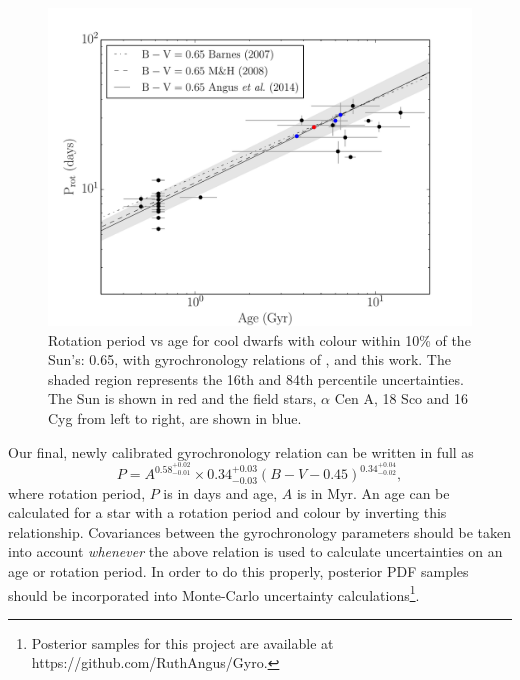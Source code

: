 \documentclass[useAMS, usenatbib]{mn2e}
\newcommand{\gyroa}{0.34}
\newcommand{\aerrp}{0.03}
\newcommand{\aerrm}{0.03}
\newcommand{\gyron}{0.58}
\newcommand{\nerrp}{0.02}
\newcommand{\nerrm}{0.01}
\newcommand{\gyrob}{0.34}
\newcommand{\berrp}{0.04}
\newcommand{\berrm}{0.02}
\begin{document}
\begin{figure}
\begin{center}
\includegraphics[width=6in, clip=true, trim=0 0 0.5in 0]{p_vs_a_solar.pdf}
\caption{Rotation period vs age for cool dwarfs with colour within 10\% of the
	Sun's: 0.65, with gyrochronology relations of \citet{Barnes2007},
	\citet{Mamajek2008} and this work. The shaded region represents the
	16th and 84th percentile uncertainties. The Sun is shown in red and the
	field stars, $\alpha$ Cen A, 18 Sco and 16 Cyg from left to right, are
	shown in blue.
\label{fig:p_vs_a_solar}}
\end{center}
\end{figure}

Our final, newly calibrated gyrochronology relation can be written in full as
\begin{equation}
	P = A^{\gyron^{+\nerrp}_{-\nerrm}} \times \gyroa^{+\aerrp}_{-\aerrm}
	(B-V-0.45)^{\gyrob^{+\berrp}_{-\berrm}},
\label{eq:Barnes2007_3}
\end{equation}
where rotation period, $P$ is in days and age, $A$ is in Myr.
An age can be calculated for a star with a rotation period and colour by
inverting this relationship.
Covariances between the gyrochronology parameters should
be taken into account {\it whenever} the above relation is used to calculate
uncertainties on an age or rotation period.
In order to do this properly, posterior PDF samples should be incorporated
into Monte-Carlo uncertainty calculations\footnote{Posterior samples for
this project are available at https://github.com/RuthAngus/Gyro.}.
\end{document}
